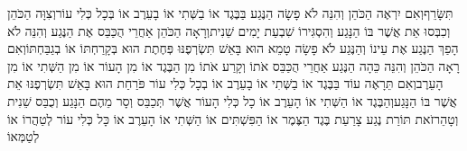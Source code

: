 \documentclass[../main/main.tex]{subfiles}
\begin{document}
\begin{multicols*}{\ncols}
תִּשָּׂרֵף\PreVerseSpace{}וְאִם יִרְאֶה הַכֹּהֵן וְהִנֵּה לֹא פָשָׂה הַנֶּגַע בַּבֶּגֶד אוֹ בַשְּׁתִי אוֹ בָעֵרֶב אוֹ בְּכָל כְּלִי עוֹר\PreVerseSpace{}וְצִוָּה הַכֹּהֵן וְכִבְּסוּ אֵת אֲשֶׁר בּוֹ הַנָּגַע וְהִסְגִּירוֹ שִׁבְעַת יָמִים שֵׁנִית\PreVerseSpace{}וְרָאָה הַכֹּהֵן אַחֲרֵי הֻכַּבֵּס אֶת הַנֶּגַע וְהִנֵּה לֹא הָפַךְ הַנֶּגַע אֶת עֵינוֹ וְהַנֶּגַע לֹא פָשָׂה טָמֵא הוּא בָּאֵשׁ תִּשְׂרְפֶנּוּ פְּחֶתֶת הוּא בְּקָרַחְתּוֹ אוֹ בְגַבַּחְתּוֹ\PreVerseSpace{}וְאִם רָאָה הַכֹּהֵן וְהִנֵּה כֵּהָה הַנֶּגַע אַחֲרֵי הֻכַּבֵּס אֹתוֹ וְקָרַע אֹתוֹ מִן הַבֶּגֶד אוֹ מִן הָעוֹר אוֹ מִן הַשְּׁתִי אוֹ מִן הָעֵרֶב\PreVerseSpace{}וְאִם תֵּרָאֶה עוֹד בַּבֶּגֶד אוֹ בַשְּׁתִי אוֹ בָעֵרֶב אוֹ בְכָל כְּלִי עוֹר פֹּרַחַת הוּא בָּאֵשׁ תִּשְׂרְפֶנּוּ אֵת אֲשֶׁר בּוֹ הַנָּגַע\PreVerseSpace{}וְהַבֶּגֶד אוֹ הַשְּׁתִי אוֹ הָעֵרֶב אוֹ כָל כְּלִי הָעוֹר אֲשֶׁר תְּכַבֵּס וְסָר מֵהֶם הַנָּגַע וְכֻבַּס שֵׁנִית וְטָהֵר\PreVerseSpace{}זֹאת תּוֹרַת נֶגַע צָרַעַת בֶּגֶד הַצֶּמֶר אוֹ הַפִּשְׁתִּים אוֹ הַשְּׁתִי אוֹ הָעֵרֶב אוֹ כָּל כְּלִי עוֹר לְטַהֲרוֹ אוֹ לְטַמְּאוֹ\OpenSection{}\par

\end{multicols*}
\end{document}

